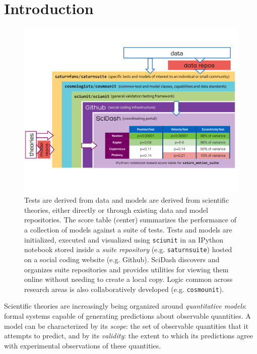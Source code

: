 \documentclass[9pt]{sig-alternate}
\begin{document}
\section{Introduction}
\begin{figure}[t]
\vspace{-30px}
\centering
\includegraphics[scale=0.45]{diagram1.pdf}
\vspace{-50px}
\caption{\small Tests are derived from data and models are derived from scientific theories, either directly or through existing data and model repositories. The score table (center) summarizes the performance of a collection of models against a suite of tests. Tests and models are initialized, executed and visualized using \texttt{sciunit} in an IPython notebook stored inside a \emph{suite repository} (e.g. \texttt{saturnsuite}) hosted on a social coding website (e.g. Github). SciDash  discovers and organizes  suite repositories and provides utilities for viewing them online without needing to create a local copy. Logic common across research areas is also collaboratively developed (e.g. \texttt{cosmounit}).}  
\label{fig:sciunit_overview}
\vspace{-10pt}
\end{figure}


Scientific theories are increasingly being organized around \emph{quantitative models}:  formal systems capable of generating predictions about observable quantities. A model can be  characterized by its \textit{scope}: the set of observable quantities that it attempts to predict, and by its \textit{validity}: the extent to which its predictions agree with experimental observations of these quantities. 
\end{document}
